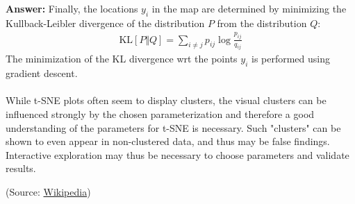 \documentclass{article}
\newenvironment{QandA}{\begin{enumerate}[label=\arabic*.]}{\end{enumerate}}
\newenvironment{answer}{\par\normalfont \textbf{Answer:}}{}
\newcommand{\KL}[2]{\text{KL}\left[#1 \Vert #2 \right]}
\begin{document}
\begin{QandA}
\begin{answer}
    Finally, the locations $y_i$ in the map are determined by minimizing the Kullback-Leibler divergence of the distribution $P$ from the distribution $Q$:
    \begin{align*}
        \KL{P}{Q} = \sum_{i \neq j} p_{ij} \log \frac{p_{ij}}{q_{ij}}
    \end{align*}
    The minimization of the KL divergence wrt the points $y_i$ is performed using gradient descent.  \\\\
    While t-SNE plots often seem to display clusters, the visual clusters can be influenced strongly by the chosen parameterization and therefore a good understanding of the parameters for t-SNE is necessary. Such "clusters" can be shown to even appear in non-clustered data, and thus may be false findings. Interactive exploration may thus be necessary to choose parameters and validate results. 
    
    (Source: \href{https://en.wikipedia.org/wiki/T-distributed_stochastic_neighbor_embedding}{Wikipedia})
    \end{answer}
\end{QandA}
\end{document}
